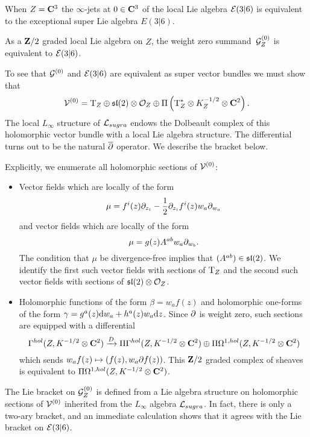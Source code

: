 When $Z = \mathbf{C}^3$ the $\infty$-jets at $0 \in \mathbf{C}^3$ of the local Lie algebra $\mathcal E(3|6)$ is equivalent to the exceptional super Lie algebra $E(3|6)$.

\begin{prop}\label{prop:v0}
As a $\mathbf{Z}/2$ graded local Lie algebra on $Z$, the weight zero summand~$\mathcal G^{(0)}_Z$ is equivalent to $\mathcal E(3|6)$. 
\end{prop}


To see that $\mathcal G^{(0)}$ and $\mathcal E(3|6)$ are equivalent as super vector bundles we must show that
\[
\mathcal V^{(0)} = {\rm T}_Z \oplus \mathfrak{sl}(2) \otimes \mathcal O_Z \oplus \Pi \left( {\rm T}^*_Z \otimes K^{-1/2}_Z \otimes \mathbf{C}^2 \right).
\]
The local $L_\infty$ structure of $\mathcal L_{sugra}$ endows the Dolbeault complex of this holomorphic vector bundle with a local Lie algebra structure.
The differential turns out to be the natural $\overline{\partial}$ operator.
We describe the bracket below.

Explicitly, we enumerate all holomorphic sections of $\mathcal V^{(0)}$:
\begin{itemize}
\item Vector fields which are locally of the form 
\[
\mu = f^i(z) \partial_{z_i} - \frac12 \partial_{z_i} f^i(z) w_a \partial_{w_a}
\]
and vector fields which are locally of the form
\[
\mu = g(z) A^{ab} w_a \partial_{w_b}.
\]
The condition that $\mu$ be divergence-free implies that $(A^{ab}) \in \mathfrak{sl}(2)$.
We identify the first such vector fields with sections of ${\rm T}_Z$ and the second such vector fields with sections of $\mathfrak{sl}(2) \otimes \mathcal O_Z$. 
\item Holomorphic functions of the form $\beta = w_a f(z)$ and holomorphic one-forms of the form $\gamma = g^{a}(z) {\rm d} w_a + h^{a} (z) w_a {\rm d} z$. 
Since $\partial$ is weight zero, such sections are equipped with a differential 
\[
\Gamma^{hol}(Z, K^{-1/2}\otimes \mathbf{C}^2) \xrightarrow{D} \Pi \Gamma^{hol}(Z, K^{-1/2} \otimes \mathbf{C}^2) \oplus \Pi\Omega^{1,hol}(Z, K^{-1/2}\otimes \mathbf{C}^2) 
\]
which sends $w_a f(z) \mapsto (f(z) , w_a \partial f (z))$. 
This $\mathbf{Z}/2$ graded complex of sheaves is equivalent to $\Pi\Omega^{1,hol}(Z, K^{-1/2}\otimes \mathbf{C}^2)$. 
\end{itemize}

The Lie bracket on $\mathcal G_Z^{(0)}$ is defined from a Lie algebra structure on holomorphic sections of $\mathcal V^{(0)}$ inherited from the $L_\infty$ algebra $\mathcal L_{sugra}$. 
In fact, there is only a two-ary bracket, and an immediate calculation shows that it agrees with the Lie bracket on $\mathcal E(3|6)$. 

